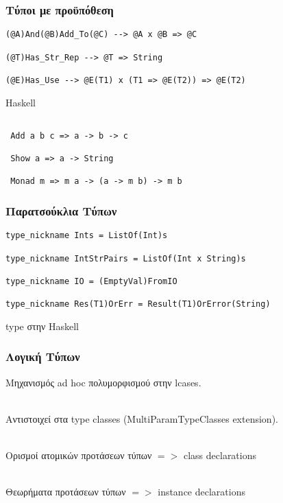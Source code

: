 \documentclass{beamer}
\def\e{\foreignlanguage{english}}
\def\h{\e{Haskell}}
\begin{document}
\begin{frame}[fragile]

\frametitle{Τύποι με προϋπόθεση}

\begin{otherlanguage}{english}
\begin{verbatim}
(@A)And(@B)Add_To(@C) --> @A x @B => @C

(@T)Has_Str_Rep --> @T => String

(@E)Has_Use --> @E(T1) x (T1 => @E(T2)) => @E(T2)

\end{verbatim}
\pause
\h
\begin{verbatim}

 Add a b c => a -> b -> c

 Show a => a -> String

 Monad m => m a -> (a -> m b) -> m b
\end{verbatim}
\end{otherlanguage}

\end{frame}

\begin{frame}[fragile]

\frametitle{Παρατσούκλια Τύπων}

\begin{otherlanguage}{english}
\begin{verbatim}
type_nickname Ints = ListOf(Int)s

type_nickname IntStrPairs = ListOf(Int x String)s

type_nickname IO = (EmptyVal)FromIO

type_nickname Res(T1)OrErr = Result(T1)OrError(String)

\end{verbatim}
\end{otherlanguage}

\e{type} στην \h

\end{frame}

\begin{frame}

\frametitle{Λογική Τύπων}

Μηχανισμός \e{ad hoc} πολυμορφισμού στην \e{lcases}.
\\~\

Αντιστοιχεί στα \e{type classes (MultiParamTypeClasses extension)}.
\\~\

Ορισμοί ατομικών προτάσεων τύπων $ => $ \e{class declarations}
\\~\

Θεωρήματα προτάσεων τύπων $ => $ \e{instance declarations}
\\~\

\end{frame}
\end{document}

